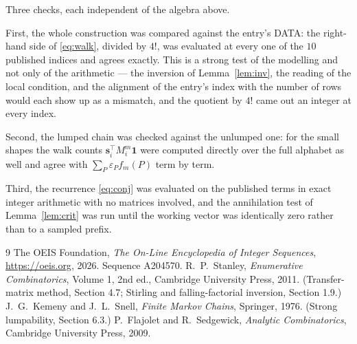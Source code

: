 \documentclass[11pt,a4paper]{article}
\theoremstyle{plain}
\theoremstyle{definition}
\begin{document}
Three checks, each independent of the algebra above.

First, the whole construction was compared against the entry's DATA: the right-hand side of
\eqref{eq:walk}, divided by $4!$, was evaluated at every one of the $10$
published indices and agrees exactly. This is a strong test of the modelling and not only of
the arithmetic --- the inversion of Lemma~\ref{lem:inv}, the reading of the local
condition, and the alignment of the entry's index with the number of rows would each
show up as a mismatch, and the quotient by $4!$ came out an integer at every index.

Second, the lumped chain was checked against the unlumped one: for the small shapes the walk
counts $\mathbf{s}_i^{\!\top}M_i^{m}\mathbf{1}$ were computed directly over the full
alphabet as well and agree with $\sum_P\varepsilon_Pf_m(P)$ term by term.

Third, the recurrence \eqref{eq:conj} was evaluated on the published terms in exact integer
arithmetic with no matrices involved, and the annihilation test of Lemma~\ref{lem:crit} was
run until the working vector was identically zero rather than to a sampled prefix.

\begin{thebibliography}{9}
 The OEIS Foundation, \emph{The On-Line Encyclopedia of Integer
Sequences}, \url{https://oeis.org}, 2026. Sequence A204570.
 R.~P.~Stanley, \emph{Enumerative Combinatorics}, Volume 1, 2nd ed.,
Cambridge University Press, 2011. (Transfer-matrix method, Section 4.7; Stirling and
falling-factorial inversion, Section 1.9.)
 J.~G.~Kemeny and J.~L.~Snell, \emph{Finite Markov Chains}, Springer,
1976. (Strong lumpability, Section 6.3.)
 P.~Flajolet and R.~Sedgewick, \emph{Analytic Combinatorics}, Cambridge
University Press, 2009.
\end{thebibliography}
\end{document}
